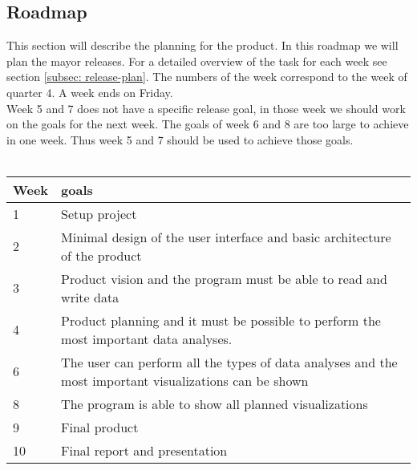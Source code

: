 \subsection{Roadmap}
\label{subsec: roadmap}
This section will describe the planning for the product. In this roadmap we will plan the mayor releases. For a detailed overview of the task for each week see section \ref{subsec: release-plan}. The numbers of the week correspond to the week of quarter 4. A week ends on Friday.\\
Week 5 and 7 does not have a specific release goal, in those week we should work on the goals for the next week. The goals of week 6 and 8 are too large to achieve in one week. Thus week 5 and 7 should be used to achieve those goals.\\\\
\begin{tabular}[H]{ l p{10cm} }
Week & goals \\
\hline
1 & Setup project \\
2 & Minimal design of the user interface and basic architecture of the product \\
3 & Product vision and the program must be able to read and write data\\
4 & Product planning and it must be possible to perform the most important data analyses. \\
6 & The user can perform all the types of data analyses and the most important visualizations can be shown \\
8 & The program is able to show all planned visualizations \\
9 & Final product \\
10 & Final report and presentation
\end{tabular}
